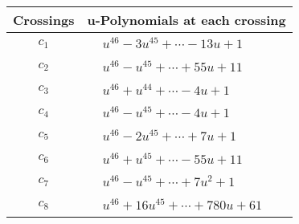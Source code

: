 \documentclass[1p]{elsarticle_modified}
\theoremstyle{definition}
\begin{document}
\begin{tabular}{m{50pt}|m{274pt}}
Crossings & \hspace{64pt}u-Polynomials at each crossing \\
\hline $$\begin{aligned}c_{1}\end{aligned}$$&$\begin{aligned}
&u^{46}-3 u^{45}+\cdots-13 u+1
\end{aligned}$\\
\hline $$\begin{aligned}c_{2}\end{aligned}$$&$\begin{aligned}
&u^{46}- u^{45}+\cdots+55 u+11
\end{aligned}$\\
\hline $$\begin{aligned}c_{3}\end{aligned}$$&$\begin{aligned}
&u^{46}+u^{44}+\cdots-4 u+1
\end{aligned}$\\
\hline $$\begin{aligned}c_{4}\end{aligned}$$&$\begin{aligned}
&u^{46}- u^{45}+\cdots-4 u+1
\end{aligned}$\\
\hline $$\begin{aligned}c_{5}\end{aligned}$$&$\begin{aligned}
&u^{46}-2 u^{45}+\cdots+7 u+1
\end{aligned}$\\
\hline $$\begin{aligned}c_{6}\end{aligned}$$&$\begin{aligned}
&u^{46}+u^{45}+\cdots-55 u+11
\end{aligned}$\\
\hline $$\begin{aligned}c_{7}\end{aligned}$$&$\begin{aligned}
&u^{46}- u^{45}+\cdots+7 u^2+1
\end{aligned}$\\
\hline $$\begin{aligned}c_{8}\end{aligned}$$&$\begin{aligned}
&u^{46}+16 u^{45}+\cdots+780 u+61
\end{aligned}$\\

\end{tabular}
\end{document}
